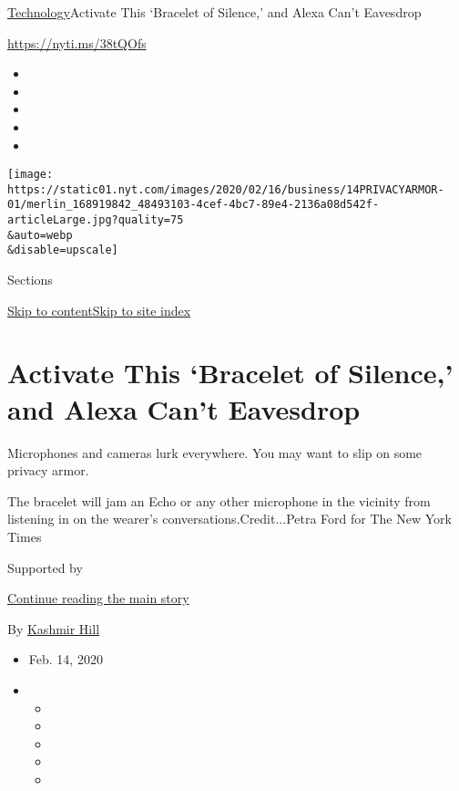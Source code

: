 \href{/section/technology}{Technology}\textbar{}Activate This `Bracelet
of Silence,' and Alexa Can't Eavesdrop

\url{https://nyti.ms/38tQOfs}

\begin{itemize}
\item
\item
\item
\item
\item
\end{itemize}

\texttt{[image: https://static01.nyt.com/images/2020/02/16/business/14PRIVACYARMOR-01/merlin\_168919842\_48493103-4cef-4bc7-89e4-2136a08d542f-articleLarge.jpg?quality=75\\\&auto=webp\\\&disable=upscale]}

Sections

\protect\hyperlink{site-content}{Skip to
content}\protect\hyperlink{site-index}{Skip to site index}

\hypertarget{activate-this-bracelet-of-silence-and-alexa-cant-eavesdrop}{%
\section{Activate This `Bracelet of Silence,' and Alexa Can't
Eavesdrop}\label{activate-this-bracelet-of-silence-and-alexa-cant-eavesdrop}}

Microphones and cameras lurk everywhere. You may want to slip on some
privacy armor.

The bracelet will jam an Echo or any other microphone in the vicinity
from listening in on the wearer's conversations.Credit...Petra Ford for
The New York Times

Supported by

\protect\hyperlink{after-sponsor}{Continue reading the main story}

By \href{https://www.nytimes.com/by/kashmir-hill}{Kashmir Hill}

\begin{itemize}
\item
  Feb. 14, 2020
\item
  \begin{itemize}
  \item
  \item
  \item
  \item
  \item
  \end{itemize}
\end{itemize}

